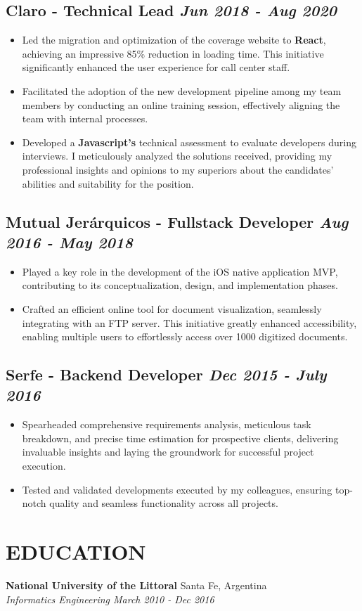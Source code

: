 \documentclass[10pt, a4paper]{article}
\begin{document}
\subsection*{Claro - Technical Lead \hfill \small \textit{Jun 2018 - Aug 2020}}
\begin{itemize}
    \setlength\itemsep{0em}
    \item Led the migration and optimization of the coverage website to \textbf{React}, achieving an impressive 85\% reduction in loading time. This initiative significantly enhanced the user experience for call center staff.
    \item Facilitated the adoption of the new development pipeline among my team members by conducting an online training session, effectively aligning the team with internal processes.
    \item Developed a \textbf{Javascript's} technical assessment to evaluate developers during interviews. I meticulously analyzed the solutions received, providing my professional insights and opinions to my superiors about the candidates' abilities and suitability for the position. 
\end{itemize}

\subsection*{Mutual Jer\'arquicos - Fullstack Developer \hfill \small \textit{Aug 2016 - May 2018}}
\begin{itemize}
    \setlength\itemsep{0em}
    \item Played a key role in the development of the iOS native application MVP, contributing to its conceptualization, design, and implementation phases.
    \item Crafted an efficient online tool for document visualization, seamlessly integrating with an FTP server. This initiative greatly enhanced accessibility, enabling multiple users to effortlessly access over 1000 digitized documents.
\end{itemize}

\subsection*{Serfe - Backend Developer \hfill \small \textit{Dec 2015 - July 2016}}
\begin{itemize}
    \setlength\itemsep{0em}
    \item Spearheaded comprehensive requirements analysis, meticulous task breakdown, and precise time estimation for prospective clients, delivering invaluable insights and laying the groundwork for successful project execution.
    \item Tested and validated developments executed by my colleagues, ensuring top-notch quality and seamless functionality across all projects.
\end{itemize}

\section{EDUCATION}

\textbf{National University of the Littoral} \hfill Santa Fe, Argentina \\
\textit{Informatics Engineering \hfill March 2010 - Dec 2016} 
\end{document}
